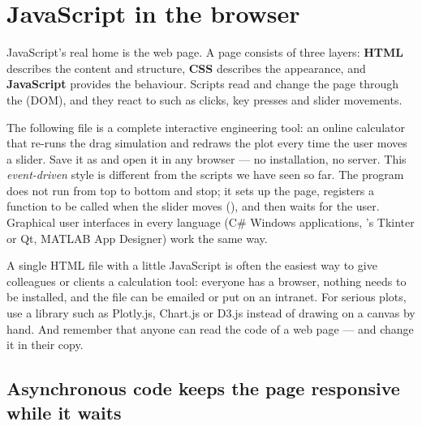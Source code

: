 \section{JavaScript in the browser}

JavaScript's real home is the web page. A page consists of three layers: \textbf{HTML}
describes the content and structure, \textbf{CSS} describes the appearance, and
\textbf{JavaScript} provides the behaviour. Scripts read and change the page through the
 (DOM), and they react to  such as clicks, key
presses and slider movements.

The following file is a complete interactive engineering tool: an online calculator that
re-runs the drag simulation and redraws the plot every time the user moves a slider. Save
it as  and open it in any browser --- no installation, no server.
This \emph{event-driven} style is different from the scripts we have seen so far. The
program does not run from top to bottom and stop; it sets up the page, registers a function
to be called when the slider moves (), and then waits for the user.
Graphical user interfaces in every language (C\# Windows applications, \py's Tkinter or
Qt, MATLAB App Designer) work the same way.

\begin{engnote}
A single HTML file with a little JavaScript is often the easiest way to give colleagues or
clients a calculation tool: everyone has a browser, nothing needs to be installed, and the
file can be emailed or put on an intranet. For serious plots, use a library such as
Plotly.js, Chart.js or D3.js instead of drawing on a canvas by hand. And remember that
anyone can read the code of a web page --- and change it in their copy.
\end{engnote}

\subsection*{Asynchronous code keeps the page responsive while it waits}

